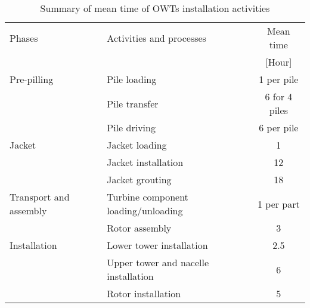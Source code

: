 
\begin{table}
\label{tab:times}

\begin{tabular}{llc}
\hline 
Phases & Activities and processes & Mean time \\ 
& & [Hour] \\ 
\hline 
Pre-pilling & Pile loading & 1 per pile \\
 & Pile transfer & 6 for 4 piles\\
 & Pile driving & 6 per pile\\
\hline
Jacket & Jacket loading & 1\\
 & Jacket installation & 12\\
 & Jacket grouting & 18\\
\hline
Transport and assembly & Turbine component loading/unloading & 1 per part\\
 & Rotor assembly & 3 \\
\hline
Installation & Lower tower installation & 2.5\\
 & Upper tower and nacelle installation & 6\\
 & Rotor installation & 5\\
\hline 
\end{tabular} 

\caption{Summary of mean time of OWTs installation activities}
\end{table}
